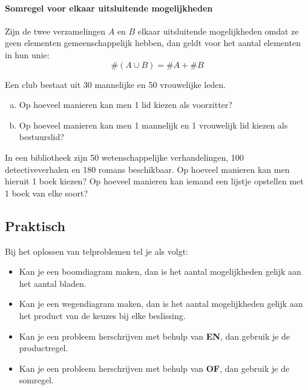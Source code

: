 \documentclass[12pt,twoside]{article}
\begin{document}
\paragraph*{Somregel voor elkaar uitsluitende mogelijkheden}
\begin{mdframed}
Zijn de twee verzamelingen $A$ en $B$ elkaar uitsluitende mogelijkheden omdat ze geen elementen gemeenschappelijk hebben, dan geldt voor het aantal elementen in hun unie:
$$\#(A\cup B) = \#A + \#B$$
\end{mdframed}

\begin{oefening}
Een club bestaat uit 30 mannelijke en 50 vrouwelijke leden.
\begin{enumerate}[(a)]
  \item Op hoeveel manieren kan men 1 lid kiezen als voorzitter?
  \item Op hoeveel manieren kan men 1 mannelijk en 1 vrouwelijk lid kiezen als bestuurslid?
\end{enumerate}
\end{oefening}

\begin{oefening}
In een bibliotheek zijn 50 wetenschappelijke verhandelingen, 100 detectiveverhalen en 180 romans beschikbaar. Op hoeveel manieren kan men hieruit 1 boek kiezen? Op hoeveel manieren kan iemand een lijstje opstellen met 1 boek van elke soort?
\end{oefening}

\subsection{Praktisch}

\begin{mdframed}
Bij het oplossen van telproblemen tel je als volgt:
\begin{itemize}
  \item Kan je een boomdiagram maken, dan is het aantal mogelijkheden gelijk aan het aantal bladen.
  \item Kan je een wegendiagram maken, dan is het aantal mogelijkheden gelijk aan het product van de keuzes bij elke beslissing.
  \item Kan je een probleem herschrijven met behulp van {\bf EN}, dan gebruik je de productregel.
  \item Kan je een probleem herschrijven met behulp van {\bf OF}, dan gebruik je de somregel.
\end{itemize}
\end{mdframed}
\end{document}

